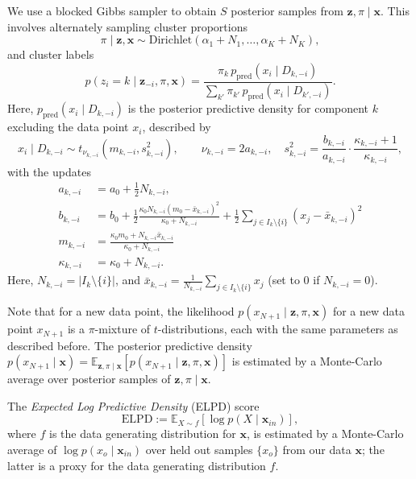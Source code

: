 \documentclass[12pt]{article}
\begin{document}
We use a blocked Gibbs sampler to obtain $S$ posterior samples from $\bm{z},
\pi \mid \bm{x}$.
This involves alternately sampling cluster proportions \[
    \pi\mid \bm{z}, \bm{x} \sim \text{Dirichlet}(\alpha_1 + N_1, \dots, \alpha_K + N_K),
\] and cluster labels \[
    p(z_i = k \mid \bm{z}_{-i}, \pi, \bm{x}) = \frac{\pi_k \, p_{\text{pred}}(x_i \mid D_{k, -i})}{\sum_{k'}\pi_{k'} \, p_{\text{pred}}(x_i \mid D_{k', -i})}.
\] Here, $p_{\text{pred}}(x_i\mid D_{k, -i})$ is the posterior predictive
density for component $k$ excluding the data point $x_i$, described by \[
    x_i\mid D_{k, -i} \sim t_{\nu_{k, -i}}(m_{k, -i}, s_{k, -i}^2), \qquad
        \nu_{k, -i} = 2a_{k, -i}, \quad
        s_{k, -i}^2 = \frac{b_{k, -i}}{a_{k, -i}} \cdot \frac{\kappa_{k, -i} + 1}{\kappa_{k, -i}},
\] with the updates \begin{align*}
    a_{k, -i} &= a_0 + \frac{1}{2}N_{k, -i}, \\
    b_{k, -i} &= b_0 + \frac{1}{2}\frac{\kappa_0N_{k, -i}(m_0 - \bar{x}_{k, -i})^2}{\kappa_0 + N_{k, -i}} + \frac{1}{2} \sum_{j \in I_k\setminus\{i\}}(x_j - \bar{x}_{k, -i})^2 \\
    m_{k, -i} &= \frac{\kappa_0m_0 + N_{k, -i}\bar{x}_{k, -i}}{\kappa_0 + N_{k, -i}} \\
    \kappa_{k, -i} &= \kappa_0 + N_{k, -i}.
\end{align*}
Here, $N_{k, -i} = |I_k\setminus\{i\}|$, and $\bar{x}_{k, -i} = \frac{1}{N_{k,
-i}}\sum_{j \in I_{k} \setminus\{i\}} x_j$ (set to $0$ if $N_{k, -i} = 0$).

Note that for a new data point, the likelihood $p(x_{N+1}\mid \bm{z}, \pi,
\bm{x})$ for a new data point $x_{N + 1}$ is a $\pi$-mixture of
$t$-distributions, each with the same parameters as described before.
The posterior predictive density $p(x_{N + 1} \mid \bm{x}) =
\mathbb{E}_{\bm{z}, \pi \mid \bm{x}}[p(x_{N + 1} \mid \bm{z}, \pi, \bm{x})]$ is
estimated by a Monte-Carlo average over posterior samples of $\bm{z}, \pi \mid
\bm{x}$.

The \emph{Expected Log Predictive Density} (ELPD) score \[
    \text{ELPD} := \mathbb{E}_{X \sim f}\left[\log{p(X \mid \bm{x}_{in})}\right],
\] where $f$ is the data generating distribution for $\bm{x}$, is estimated by
a Monte-Carlo average of $\log{p(x_o\mid \bm{x}_{in})}$ over held out samples
$\{x_o\}$ from our data $\bm{x}$; the latter is a proxy for the data generating
distribution $f$.
\end{document}
